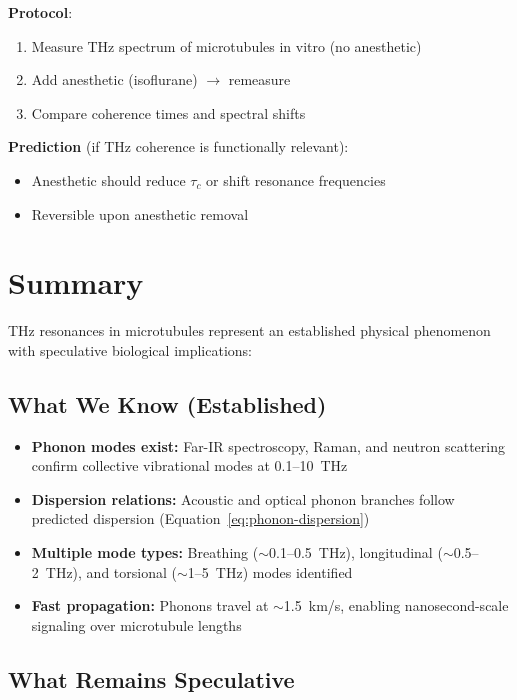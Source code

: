 \begin{itemize}
\textbf{Protocol}:
\begin{enumerate}
\item Measure THz spectrum of microtubules in vitro (no anesthetic)
\item Add anesthetic (isoflurane) $\rightarrow$ remeasure
\item Compare coherence times and spectral shifts
\end{enumerate}

\textbf{Prediction} (if THz coherence is functionally relevant):
\begin{itemize}
\item Anesthetic should reduce $\tau_c$ or shift resonance frequencies
\item Reversible upon anesthetic removal
\end{itemize}




\section{Summary}
\label{sec:summary}

THz resonances in microtubules represent an established physical phenomenon with speculative biological implications:

\subsection{What We Know (Established)}

\begin{itemize}
\item \textbf{Phonon modes exist:} Far-IR spectroscopy, Raman, and neutron scattering confirm collective vibrational modes at 0.1--10~THz
\item \textbf{Dispersion relations:} Acoustic and optical phonon branches follow predicted dispersion (Equation~\ref{eq:phonon-dispersion})
\item \textbf{Multiple mode types:} Breathing ($\sim$0.1--0.5~THz), longitudinal ($\sim$0.5--2~THz), and torsional ($\sim$1--5~THz) modes identified
\item \textbf{Fast propagation:} Phonons travel at $\sim$1.5~km/s, enabling nanosecond-scale signaling over microtubule lengths
\end{itemize}

\subsection{What Remains Speculative}


\end{itemize}
